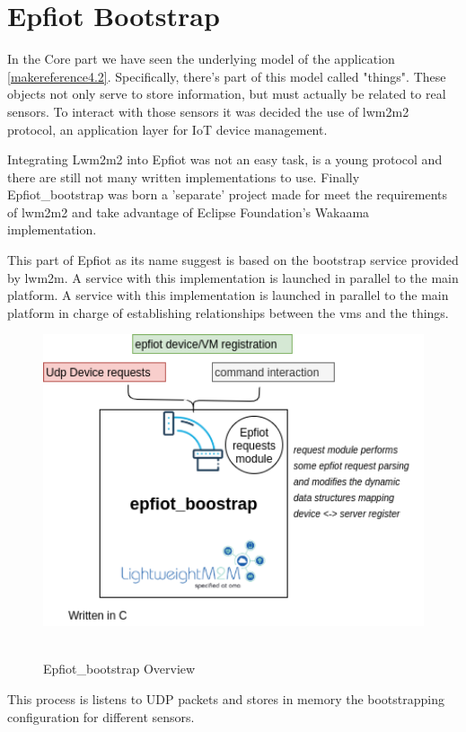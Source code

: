 \section{Epfiot Bootstrap}
\label{makereference4.3}
In the Core part we have seen the underlying model of the application \ref{makereference4.2}. Specifically, there's part of this model called "things".
These objects not only serve to store information, but must actually be related to real sensors. To interact with those sensors it was decided the use of lwm2m2 protocol, an application layer for IoT device management.

Integrating Lwm2m2 into Epfiot was not an easy task, is a young protocol and there are still not many written implementations to use.
Finally Epfiot\_bootstrap was born a 'separate' project made for meet the requirements of lwm2m2 and take advantage of Eclipse Foundation's Wakaama implementation.

This part of Epfiot as its name suggest is based on the bootstrap service provided by lwm2m. A service with this implementation is launched in parallel to the main platform. A service with this implementation is launched in parallel to the main platform in charge of establishing relationships between the vms and the things.

\begin{figure}[h!]%
\centering
    \includegraphics[width=5.0in]{figures/bootstrap.png}
~\caption{Epfiot\_bootstrap Overview}
\label{figure4.7}
\end{figure}

This process is listens to UDP packets and stores in memory the bootstrapping configuration for different sensors.
\newpage


